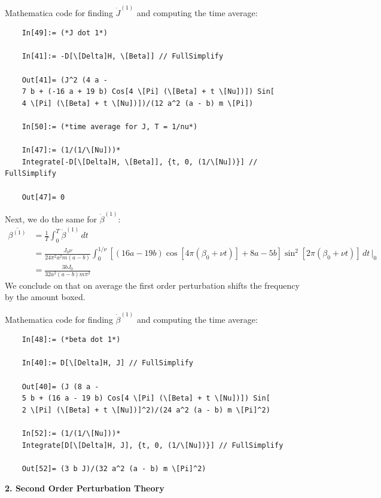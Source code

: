 \documentclass{article}
\theoremstyle{definition}
\newcommand{\be}{\beta}
\newcommand{\f}[2]{\frac{#1}{#2}}
\begin{document}
\begin{enumerate}[label=(\alph*)]
	Mathematica code for finding $\dot J^{(1)}$ and computing the time average:
	\begin{lstlisting}
	In[49]:= (*J dot 1*)
	
	In[41]:= -D[\[Delta]H, \[Beta]] // FullSimplify
	
	Out[41]= (J^2 (4 a - 
	7 b + (-16 a + 19 b) Cos[4 \[Pi] (\[Beta] + t \[Nu])]) Sin[
	4 \[Pi] (\[Beta] + t \[Nu])])/(12 a^2 (a - b) m \[Pi])
	
	In[50]:= (*time average for J, T = 1/nu*)
	
	In[47]:= (1/(1/\[Nu]))*
	Integrate[-D[\[Delta]H, \[Beta]], {t, 0, (1/\[Nu])}] // FullSimplify
	
	Out[47]= 0
	\end{lstlisting}
	
	Next, we do the same for $\dot{\be}^{(1)}$:
	\begin{align*}
	\overline{\be^{(1)}}
	&= \f{1}{T} \int^T_0  \dot \be^{(1)}\,dt \\
	&= \frac{J_0 \nu }{24 \pi ^2 a^2 m (a-b)}
	\int_0^{1/\nu} [(16 a-19 b) \cos [4 \pi  (\beta_0 +\nu  t)] + 8 a-5
	b] \sin ^2[2 \pi  (\beta_0 +\nu  t)] \,dt\,\bigg\vert_0\\
	&= \boxed{\f{3bJ_0 }{32 a^2 (a-b)m \pi^2}}
	\end{align*}
	We conclude on that on average the first order perturbation shifts the frequency by the amount boxed. 
	
	Mathematica code for finding $\dot \be^{(1)}$ and computing the time average:
	\begin{lstlisting}
	In[48]:= (*beta dot 1*)
	
	In[40]:= D[\[Delta]H, J] // FullSimplify
	
	Out[40]= (J (8 a - 
	5 b + (16 a - 19 b) Cos[4 \[Pi] (\[Beta] + t \[Nu])]) Sin[
	2 \[Pi] (\[Beta] + t \[Nu])]^2)/(24 a^2 (a - b) m \[Pi]^2)
	
	In[52]:= (1/(1/\[Nu]))*
	Integrate[D[\[Delta]H, J], {t, 0, (1/\[Nu])}] // FullSimplify
	
	Out[52]= (3 b J)/(32 a^2 (a - b) m \[Pi]^2)
	\end{lstlisting}
\end{enumerate}




\noindent \textbf{2. Second Order Perturbation Theory}
\end{document}

